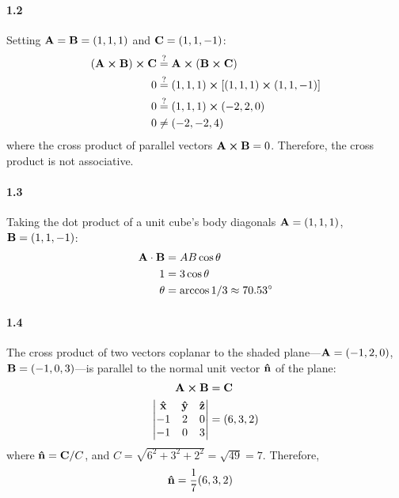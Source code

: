 \documentclass[../main.tex]{subfiles}
\begin{document}
\paragraph{1.2}
Setting $\vb{A} = \vb{B} = (1, 1, 1)$ and $\vb{C} = (1, 1, -1)$:
\begin{align*}
    (\vb{A} \cp \vb{B}) \cp \vb{C} &\overset{?}{=} \vb{A} \cp (\vb{B} \cp \vb{C})\\
    0 &\overset{?}{=} (1, 1, 1) \cp [(1, 1, 1) \cp (1, 1, -1)]\\
    0 &\overset{?}{=} (1, 1, 1) \cp (-2, 2, 0)\\
    0 &\neq (-2, -2, 4)
\end{align*}
where the cross product of parallel vectors $\vb{A} \cp \vb{B} = 0$. Therefore, the cross product is
not associative.

\paragraph{1.3}
Taking the dot product of a unit cube's body diagonals $\vb{A} = (1, 1, 1)$, $\vb{B} = (1, 1, -1)$:
\begin{align*}
    \vb{A} \cdot \vb{B} &= AB \cos{\theta} \\
    1 &= 3 \cos{\theta} \\
    \theta &= \arccos{1/3} \approx \ang{70.53}
\end{align*} 

\paragraph{1.4}
The cross product of two vectors coplanar to the shaded plane---$\vb{A} = (-1, 2, 0)$,
$\vb{B} = (-1, 0, 3)$---is parallel to the normal unit vector $\vu{n}$ of the plane:
\begin{align*}
    \vb{A} \cp \vb{B} &= \vb{C} \\
    \begin{vmatrix}
        \vu{x} & \vu{y} & \vu{z} \\
        -1 & 2 & 0 \\
        -1 & 0 & 3
    \end{vmatrix} &= (6, 3, 2) \\
\end{align*}
where $\vu{n} = \vb{C} / C$, and $C = \sqrt{6^2 + 3^2 + 2^2} = \sqrt{49} = 7$. Therefore,
\begin{align*}
    \vu{n} &= \frac{1}{7} (6, 3, 2)
\end{align*}
\end{document}

